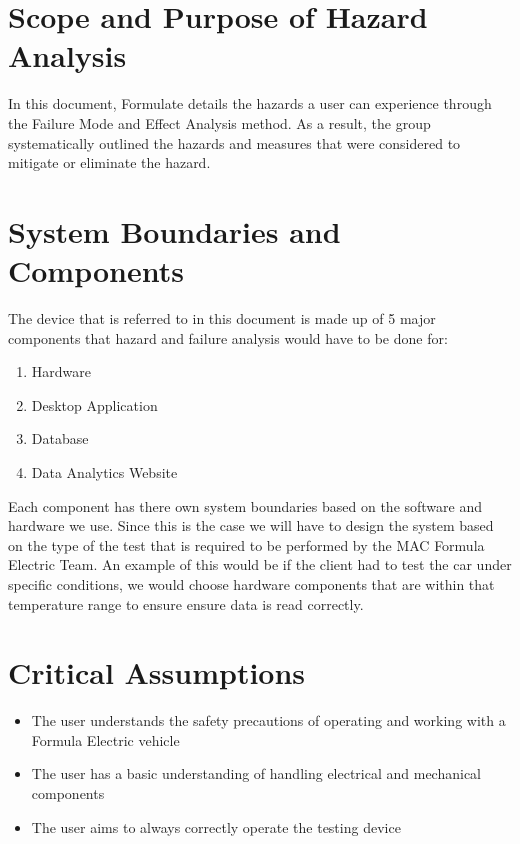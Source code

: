 \documentclass{article}
\begin{document}

\section{Scope and Purpose of Hazard Analysis}

In this document, Formulate details the hazards a user can experience through the Failure Mode and Effect Analysis method. As a result, the group systematically outlined the hazards and measures that were considered to mitigate or eliminate the hazard.

\section{System Boundaries and Components}

The device that is referred to in this document is made up of 5 major components that hazard and failure analysis would have to be done for:

\begin{enumerate}
\item Hardware
\item Desktop Application
\item Database
\item Data Analytics Website 
\end{enumerate}

Each component has there own system boundaries based on the software and hardware we use. Since this is the case we will have to design the system based on the type of the test that is required to be performed by the MAC Formula Electric Team. An example of this would be if the client had to test the car under specific conditions, we would choose hardware components that are within that temperature range to ensure ensure data is read correctly.

\section{Critical Assumptions}

\begin{itemize}
	\item The user understands the safety precautions of operating and working with a Formula Electric vehicle
	\item The user has a basic understanding of handling electrical and mechanical components
	\item The user aims to always correctly operate the testing device
\end{itemize}
\end{document}
